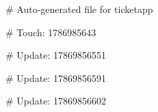 # Auto-generated file for ticketapp

# Touch: 1786985643

# Update: 17869856551

# Update: 17869856591

# Update: 17869856602
